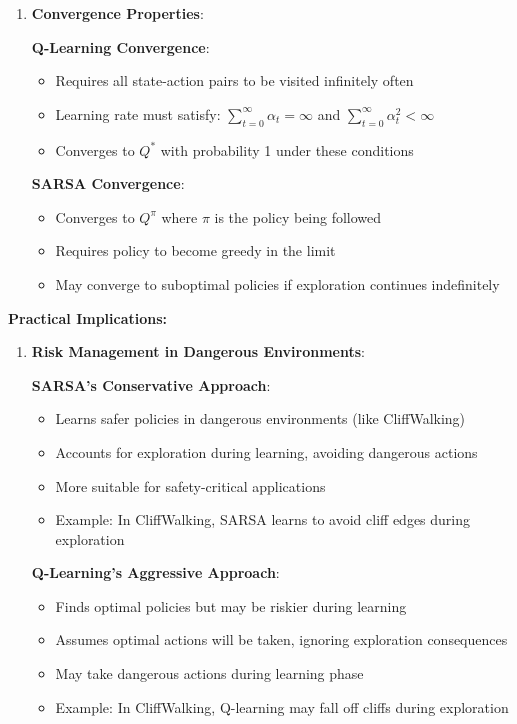 \documentclass[12pt]{article}
\begin{document}
{{{\begin{enumerate}
    \item \textbf{Convergence Properties}:
    
    \textbf{Q-Learning Convergence}:
    \begin{itemize}
        \item Requires all state-action pairs to be visited infinitely often
        \item Learning rate must satisfy: $\sum_{t=0}^{\infty} \alpha_t = \infty$ and $\sum_{t=0}^{\infty} \alpha_t^2 < \infty$
        \item Converges to $Q^*$ with probability 1 under these conditions
    \end{itemize}
    
    \textbf{SARSA Convergence}:
    \begin{itemize}
        \item Converges to $Q^\pi$ where $\pi$ is the policy being followed
        \item Requires policy to become greedy in the limit
        \item May converge to suboptimal policies if exploration continues indefinitely
    \end{itemize}
\end{enumerate}

\textbf{Practical Implications:}

\begin{enumerate}
    \item \textbf{Risk Management in Dangerous Environments}:
    
    \textbf{SARSA's Conservative Approach}:
    \begin{itemize}
        \item Learns safer policies in dangerous environments (like CliffWalking)
        \item Accounts for exploration during learning, avoiding dangerous actions
        \item More suitable for safety-critical applications
        \item Example: In CliffWalking, SARSA learns to avoid cliff edges during exploration
    \end{itemize}
    
    \textbf{Q-Learning's Aggressive Approach}:
    \begin{itemize}
        \item Finds optimal policies but may be riskier during learning
        \item Assumes optimal actions will be taken, ignoring exploration consequences
        \item May take dangerous actions during learning phase
        \item Example: In CliffWalking, Q-learning may fall off cliffs during exploration
    \end{itemize}
    

\end{enumerate}}}}
\end{document}
